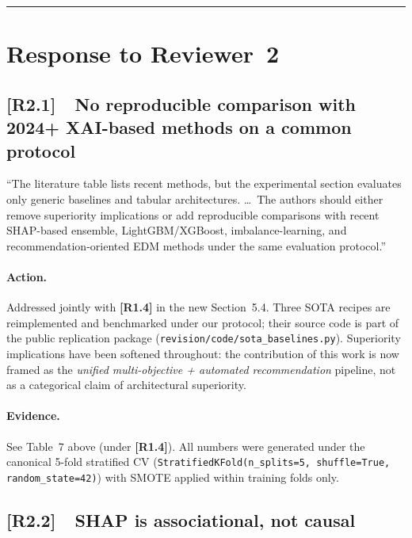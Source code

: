 \documentclass[11pt,a4paper]{article}
\newcommand{\cid}[1]{\textcolor{revred}{\textbf{[#1]}}}
\newcommand{\filebox}[1]{\texttt{\small #1}}
\newcommand{\sectref}[1]{Section~#1}
\begin{document}
\begin{itemize}
\bigskip
\hrule
\bigskip

\section{Response to Reviewer~2}

\subsection*{\cid{R2.1}~~No reproducible comparison with 2024+ XAI-based methods on a common protocol}

\begin{reviewerquote}
``The literature table lists recent methods, but the experimental section evaluates only generic baselines and tabular architectures. \ldots\ The authors should either remove superiority implications or add reproducible comparisons with recent SHAP-based ensemble, LightGBM/XGBoost, imbalance-learning, and recommendation-oriented EDM methods under the same evaluation protocol.''
\end{reviewerquote}

\paragraph{Action.} Addressed jointly with \cid{R1.4} in the new \sectref{5.4}. Three SOTA recipes are reimplemented and benchmarked under our protocol; their source code is part of the public replication package (\filebox{revision/code/sota\_baselines.py}). Superiority implications have been softened throughout: the contribution of this work is now framed as the \emph{unified multi-objective + automated recommendation} pipeline, not as a categorical claim of architectural superiority.

\paragraph{Evidence.} See Table~7 above (under \cid{R1.4}). All numbers were generated under the canonical 5-fold stratified CV (\texttt{StratifiedKFold(n\_splits=5, shuffle=True, random\_state=42)}) with SMOTE applied within training folds only.

\subsection*{\cid{R2.2}~~SHAP is associational, not causal}


\end{itemize}
\end{document}
